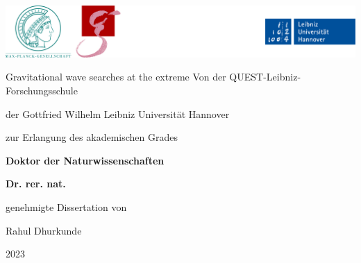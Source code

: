 \begin{titlepage}
\begin{center}
\includegraphics[width=\textwidth]{assets/logo_band_2.png}\par
\vspace{2cm}

{\Huge{Gravitational wave searches at the extreme
}}
\vfill
Von der QUEST-Leibniz-Forschungsschule\par
der Gottfried Wilhelm Leibniz Universität Hannover\par
\vspace{1cm}
zur Erlangung des akademischen Grades\par
\textbf{Doktor der Naturwissenschaften}\par
\textbf{Dr. rer. nat.}\par
\vspace{1cm}
genehmigte Dissertation von\par
\vfill
{\Large{Rahul Dhurkunde}}\par
\vfill
{\Large{2023}}
\end{center}
\end{titlepage}
\clearpage
\thispagestyle{empty}

